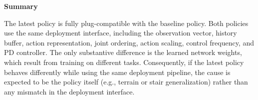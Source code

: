 \documentclass[11pt]{article}
\begin{document}
\bigskip

\noindent\textbf{Summary}

The latest policy is fully plug-compatible with the baseline policy. Both policies use the same deployment interface, including the observation vector, history buffer, action representation, joint ordering, action scaling, control frequency, and PD controller. The only substantive difference is the learned network weights, which result from training on different tasks. Consequently, if the latest policy behaves differently while using the same deployment pipeline, the cause is expected to be the policy itself (e.g., terrain or stair generalization) rather than any mismatch in the deployment interface.
\end{document}
